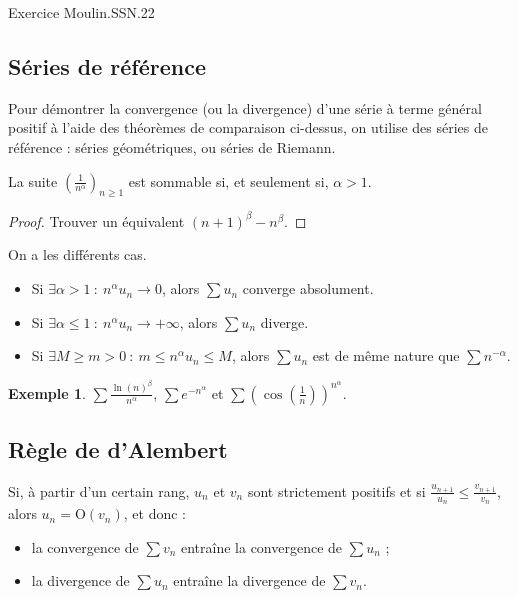 \documentclass[french]{article}
\renewcommand{\O}{\text{O}}
\theoremstyle{plain}
\theoremstyle{definition}
\newtheorem*{ex}{Exemple}
\theoremstyle{remark}
\begin{document}
Exercice Moulin.SSN.22

\subsection{Séries de référence}

Pour démontrer la convergence (ou la divergence) d'une série à terme général positif à l'aide des théorèmes de comparaison ci-dessus, on utilise des séries de référence : séries géométriques, ou séries de Riemann.

\begin{prop}%
	La suite $\displaystyle\left(\frac{1}{n^\alpha}\right)_{n\geqslant 1}$ est sommable si, et seulement si, $\alpha >1$.
\end{prop}
\begin{proof}
	Trouver un équivalent $(n+1)^\beta-n^\beta$.
\end{proof}

\begin{met}
	On a les différents cas.
	\begin{itemize}
		\item Si $\exists\alpha >1 \ : \ n^\alpha u_n\to 0$, alors $\sum u_n$ converge absolument.
		\item Si $\exists\alpha \leqslant1 \ : \ n^\alpha u_n\to+\infty$, alors $\sum u_n$ diverge.
		\item Si $\exists M\geqslant m>0\ : \ m\leqslant n^\alpha u_n\leqslant M$, alors $\sum u_n$ est de même nature que $\sum n^{-\alpha}$.
	\end{itemize}
\end{met}

\begin{ex}
	$\displaystyle\sum\frac{\ln(n)^\beta}{n^\alpha}$, $\displaystyle\sum e^{-n^\alpha}$ et $\displaystyle\sum\left(\cos\left(\frac{1}{n}\right)\right)^{n^\alpha}$.
\end{ex}

\subsection{Règle de d'Alembert}

\begin{prop}%
	Si, à partir d'un certain rang, $u_n$ et $v_n$ sont strictement positifs et si $\displaystyle\frac{u_{n+1}}{u_n}\leqslant\frac{v_{n+1}}{v_n}$, alors $u_n=\O(v_n)$, et donc :
	\begin{itemize}
		\item la convergence de $\displaystyle\sum v_n$ entraîne la convergence de $\displaystyle\sum u_n$ ;
		\item la divergence de $\displaystyle\sum u_n$ entraîne la divergence de $\displaystyle\sum v_n$.
	\end{itemize}
\end{prop}
\end{document}
